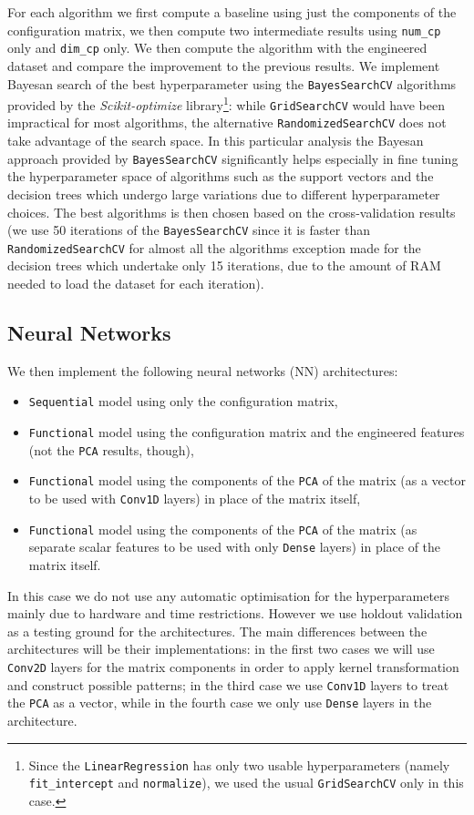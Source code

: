     For each algorithm we first compute a baseline using just the components of the configuration matrix, we then compute two intermediate results using \texttt{num\_cp} only and \texttt{dim\_cp} only. We then compute the algorithm with the engineered dataset and compare the improvement to the previous results. We implement Bayesan search of the best hyperparameter using the \texttt{BayesSearchCV} algorithms provided by the \textit{Scikit-optimize} library\footnote{Since the \texttt{LinearRegression} has only two usable hyperparameters (namely \texttt{fit\_intercept} and \texttt{normalize}), we used the usual \texttt{GridSearchCV} only in this case.}: while \texttt{GridSearchCV} would have been impractical for most algorithms, the alternative \texttt{RandomizedSearchCV} does not take advantage of the search space. In this particular analysis the Bayesan approach provided by \texttt{BayesSearchCV} significantly helps especially in fine tuning the hyperparameter space of algorithms such as the support vectors and the decision trees which undergo large variations due to different hyperparameter choices. The best algorithms is then chosen based on the cross-validation results (we use 50 iterations of the \texttt{BayesSearchCV} since it is faster than \texttt{RandomizedSearchCV} for almost all the algorithms exception made for the decision trees which undertake only 15 iterations, due to the amount of RAM needed to load the dataset for each iteration).

\subsection{Neural Networks}
    We then implement the following neural networks (NN) architectures:
    \begin{itemize}
        \item \texttt{Sequential} model using only the configuration matrix,
        \item \texttt{Functional} model using the configuration matrix and the engineered features (not the \texttt{PCA} results, though),
        \item \texttt{Functional} model using the components of the \texttt{PCA} of the matrix (as a vector to be used with \texttt{Conv1D} layers) in place of the matrix itself,
        \item \texttt{Functional} model using the components of the \texttt{PCA} of the matrix (as separate scalar features to be used with only \texttt{Dense} layers) in place of the matrix itself.
    \end{itemize}
    In this case we do not use any automatic optimisation for the hyperparameters mainly due to hardware and time restrictions. However we use holdout validation as a testing ground for the architectures. The main differences between the architectures will be their implementations: in the first two cases we will use \texttt{Conv2D} layers for the matrix components in order to apply kernel transformation and construct possible patterns; in the third case we use \texttt{Conv1D} layers to treat the \texttt{PCA} as a vector, while in the fourth case we only use \texttt{Dense} layers in the architecture.
    

